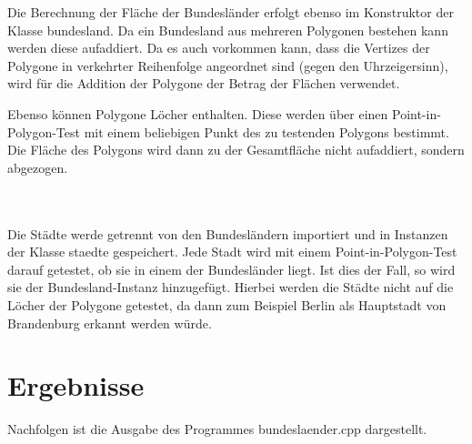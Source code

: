 \documentclass[12pt]{scrartcl}
\begin{document}
Die Berechnung der Fläche der Bundesländer erfolgt ebenso im Konstruktor der Klasse bundesland.
Da ein Bundesland aus mehreren Polygonen bestehen kann werden diese aufaddiert.
Da es auch vorkommen kann, dass die Vertizes der Polygone in verkehrter Reihenfolge angeordnet sind (gegen den Uhrzeigersinn), wird für die Addition der Polygone der Betrag der Flächen verwendet.

Ebenso können Polygone Löcher enthalten. Diese werden über einen Point-in-Polygon-Test mit einem beliebigen Punkt des zu testenden Polygons bestimmt.
Die Fläche des Polygons wird dann zu der Gesamtfläche nicht aufaddiert, sondern abgezogen.

\ \\~\\

Die Städte werde getrennt von den Bundesländern importiert und in Instanzen der Klasse staedte gespeichert.
Jede Stadt wird mit einem Point-in-Polygon-Test darauf getestet, ob sie in einem der Bundesländer liegt.
Ist dies der Fall, so wird sie der Bundesland-Instanz hinzugefügt.
Hierbei werden die Städte nicht auf die Löcher der Polygone getestet, da dann zum Beispiel Berlin als Hauptstadt von Brandenburg erkannt werden würde.

\section{Ergebnisse}
Nachfolgen ist die Ausgabe des Programmes bundeslaender.cpp dargestellt.
\end{document}

